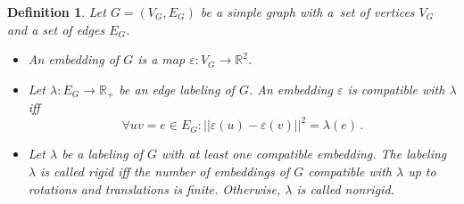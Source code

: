 \documentclass[a1paper, portrait,innermargin=10mm, blockverticalspace=10mm, colspace=10mm,margin=0mm,]{tikzposter} %
\newtheorem{defn}{Definition}
\newcommand{\RR}{\mathbb{R}}
\begin{document}
\begin{columns}
{\begin{defn}
Let $G=(V_G,E_G)$ be a simple graph with a~set of vertices $V_G$ and a set of edges $E_G$. 
\begin{itemize}
	\item An \emph{embedding} of $G$ is a map $\varepsilon:V_G\rightarrow \RR^2$. 
	\item  Let $\lambda:E_G\rightarrow \RR_+$ be an edge labeling of $G$. An embedding $\varepsilon$ is \emph{compatible with} $\lambda$ iff  $$\forall uv=e\in E_G \colon ||\varepsilon(u)-\varepsilon(v)||^2=\lambda(e)\,.$$
	\item Let $\lambda$ be a labeling of $G$ with at least one compatible embedding. The labeling $\lambda$ is called \emph{rigid} iff the number of embeddings of $G$ compatible with $\lambda$ up to rotations and translations is finite. Otherwise,  $\lambda$ is called \emph{nonrigid}.
\end{itemize} 
\end{defn}


}
\end{columns}
\end{document}
